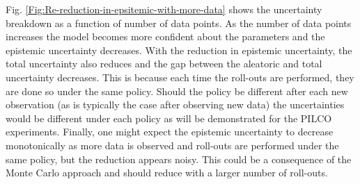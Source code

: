 Fig. \ref{Fig:Re-reduction-in-epsitemic-with-more-data} shows the uncertainty breakdown as a function of number of data points. As the number of data points increases the model becomes more confident about the parameters and the epistemic uncertainty decreases. With the reduction in epistemic uncertainty, the total uncertainty also reduces and the gap between the aleatoric and total uncertainty decreases. This is because each time the roll-outs are performed, they are done so under the same policy. Should the policy be different after each new observation (as is typically the case after observing new data) the uncertainties would be different under each policy as will be demonstrated for the PILCO experiments. Finally, one might expect the epistemic uncertainty to decrease monotonically as more data is observed and roll-outs are performed under the same policy, but the reduction appears noisy. This could be a consequence of the Monte Carlo approach and should reduce with a larger number of roll-outs.
 
